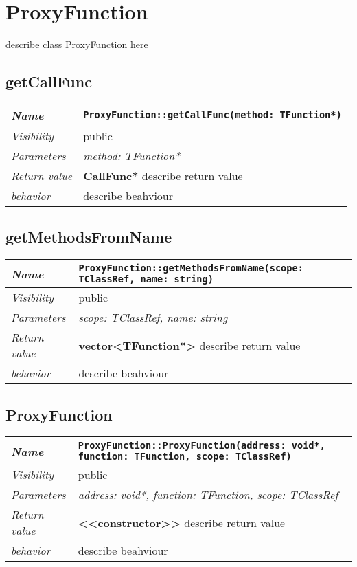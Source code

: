 \chapter{ProxyFunction}
describe class ProxyFunction here
\section{getCallFunc}
\begin{longtable}{p{3cm} @{\hskip 1cm} p{12cm}}
 \hline
\textit{Name} & \texttt{ProxyFunction::getCallFunc(method: TFunction*)}\\
\hline
 \textit{Visibility} & public\\
\hline
\textit{Parameters} & \textit{method: TFunction*}\\
\hline
\textit{Return value} & \textbf{ CallFunc*} describe return value\\
  \hline
 \textit{behavior} & describe beahviour \\
\hline
\end{longtable} \pagebreak
 \section{getMethodsFromName}
\begin{longtable}{p{3cm} @{\hskip 1cm} p{12cm}}
 \hline
\textit{Name} & \texttt{ProxyFunction::getMethodsFromName(scope: TClassRef, name: string)}\\
\hline
 \textit{Visibility} & public\\
\hline
\textit{Parameters} & \textit{scope: TClassRef, name: string}\\
\hline
\textit{Return value} & \textbf{ vector<TFunction*>} describe return value\\
  \hline
 \textit{behavior} & describe beahviour \\
\hline
\end{longtable} \pagebreak
 \section{ProxyFunction}
\begin{longtable}{p{3cm} @{\hskip 1cm} p{12cm}}
 \hline
\textit{Name} & \texttt{ProxyFunction::ProxyFunction(address: void*, function: TFunction, scope: TClassRef)}\\
\hline
 \textit{Visibility} & public\\
\hline
\textit{Parameters} & \textit{address: void*, function: TFunction, scope: TClassRef}\\
\hline
\textit{Return value} & \textbf{ <<constructor>>} describe return value\\
  \hline
 \textit{behavior} & describe beahviour \\
\hline
\end{longtable} \pagebreak
